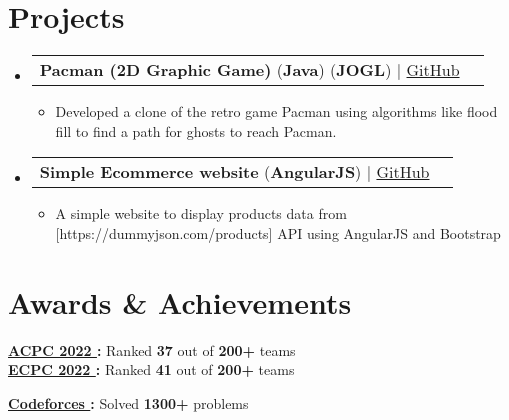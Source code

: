 \documentclass[a4paper,12pt]{article}
\makeatletter
\newcommand{\resumeItem}[1]{
  \item\small{
    {#1 \vspace{-2pt}}
  }
}
\newcommand{\resumeProjectHeading}[2]{
    \vspace{-2pt}\item
    \begin{tabular*}{0.97\textwidth}{l@{\extracolsep{\fill}}r}
      \small#1 & #2 \\
    \end{tabular*}\vspace{-7pt}
}
\newcommand{\resumeSubHeadingListStart}{\begin{itemize}[leftmargin=0.15in, label={}]}
\newcommand{\resumeSubHeadingListEnd}{\end{itemize}}
\newcommand{\resumeItemListStart}{\begin{itemize}}
\newcommand{\resumeItemListEnd}{\end{itemize}\vspace{-5pt}}
\makeatother
\begin{document}

\section{Projects}
\vspace{3pt}
\resumeSubHeadingListStart


\resumeProjectHeading
{\textbf{Pacman (2D Graphic Game)} (\textbf{Java}) (\textbf{JOGL}) $|$ \href{https://github.com/Yossef-Magdy/Pacman}{GitHub \faLink}}{}
\resumeItemListStart
\resumeItem{Developed a clone of the retro game Pacman using algorithms like flood fill to find a path for ghosts to reach Pacman.}
\resumeItemListEnd

\resumeProjectHeading
{\textbf{Simple Ecommerce website} (\textbf{AngularJS}) $|$ \href{https://github.com/Yossef-Magdy/angular-ecommerce}{GitHub \faLink}}{}
\resumeItemListStart
\resumeItem{A simple website to display products data from [https://dummyjson.com/products] API using AngularJS and Bootstrap}
\resumeItemListEnd

\resumeSubHeadingListEnd





\section{Awards \& Achievements}
  \vspace{2pt}
  \resumeSubHeadingListStart
    \small{\item{
        \textbf{\href{https://drive.google.com/file/d/1kxMcLRh3jysNW1Yy4loKLkkGkbccFPU_/view?usp=drive_link}{ACPC 2022 }:}
        {Ranked \textbf{37} out of \textbf{200+} teams} 
        \\ \vspace{3pt}
		\textbf{\href{https://drive.google.com/file/d/1p7HnOlci6spjWYa2FNIF-FpbT-O8zQ8h/view?usp=drive_link}{ECPC 2022 }:} 
		{Ranked \textbf{41} out of \textbf{200+} teams} 
		\\ \vspace{3pt}
		
		\textbf{{\href{https://codeforces.com/profile/Yossef}{Codeforces }}:}
		{Solved \textbf{1300+} problems} \\ 
		\vspace{3pt}
    }}
  \resumeSubHeadingListEnd
\end{document}
